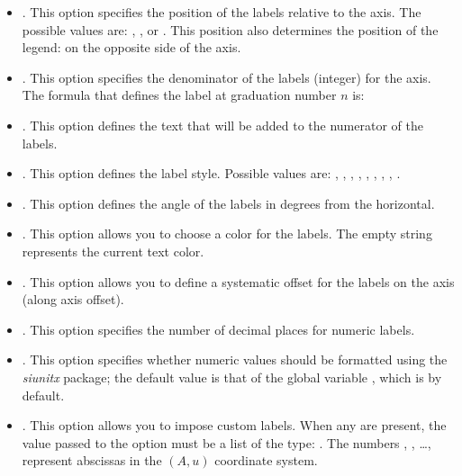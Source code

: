 \begin{itemize}
    \item {}. This option specifies the position of the labels relative to the axis. The possible values ​​are: , , or . This position also determines the position of the legend: on the opposite side of the axis.

    \item {}. This option specifies the denominator of the labels (integer) for the axis. The formula that defines the label at graduation number $n$ is: 

    \item {}. This option defines the text that will be added to the numerator of the labels.

     \item {}. This option defines the label style. Possible values ​​are:  , , , , , , , , .

    \item {}. This option defines the angle of the labels in degrees from the horizontal.

    \item {}. This option allows you to choose a color for the labels. The empty string represents the current text color.

    \item {}. This option allows you to define a systematic offset for the labels on the axis (along axis offset).

    \item {}. This option specifies the number of decimal places for numeric labels.

    \item {}. This option specifies whether numeric values ​​should be formatted using the \emph{siunitx} package; the default value is that of the global variable , which is \false by default.

    \item {}. This option allows you to impose custom labels. When any are present, the value passed to the option must be a list of the type: . The numbers , , \ldots, represent abscissas in the $(A,u)$ coordinate system.
\end{itemize}

